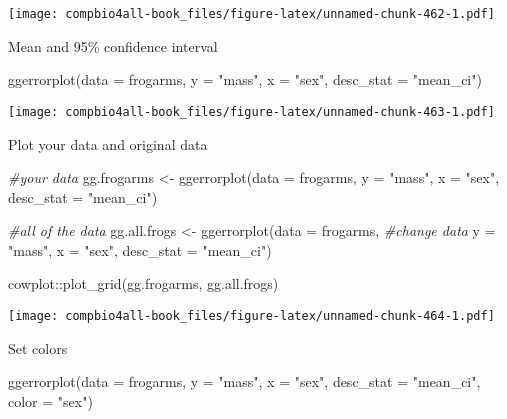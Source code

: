 \documentclass[
]{book}
\newenvironment{Shaded}{\begin{snugshade}}{\end{snugshade}}
\newcommand{\AttributeTok}[1]{\textcolor[rgb]{0.77,0.63,0.00}{#1}}
\newcommand{\CommentTok}[1]{\textcolor[rgb]{0.56,0.35,0.01}{\textit{#1}}}
\newcommand{\FunctionTok}[1]{\textcolor[rgb]{0.00,0.00,0.00}{#1}}
\newcommand{\NormalTok}[1]{#1}
\newcommand{\OtherTok}[1]{\textcolor[rgb]{0.56,0.35,0.01}{#1}}
\newcommand{\SpecialCharTok}[1]{\textcolor[rgb]{0.00,0.00,0.00}{#1}}
\newcommand{\StringTok}[1]{\textcolor[rgb]{0.31,0.60,0.02}{#1}}
\begin{document}
\texttt{[image: compbio4all-book\_files/figure-latex/unnamed-chunk-462-1.pdf]}

Mean and 95\% confidence interval

\begin{Shaded}
\begin{Highlighting}[]
\FunctionTok{ggerrorplot}\NormalTok{(}\AttributeTok{data =}\NormalTok{ frogarms,}
          \AttributeTok{y =} \StringTok{"mass"}\NormalTok{,}
          \AttributeTok{x =} \StringTok{"sex"}\NormalTok{,}
          \AttributeTok{desc\_stat =} \StringTok{"mean\_ci"}\NormalTok{)}
\end{Highlighting}
\end{Shaded}

\texttt{[image: compbio4all-book\_files/figure-latex/unnamed-chunk-463-1.pdf]}

Plot your data and original data

\begin{Shaded}
\begin{Highlighting}[]
\CommentTok{\#your data}
\NormalTok{gg.frogarms }\OtherTok{\textless{}{-}} \FunctionTok{ggerrorplot}\NormalTok{(}\AttributeTok{data =}\NormalTok{ frogarms,}
          \AttributeTok{y =} \StringTok{"mass"}\NormalTok{,}
          \AttributeTok{x =} \StringTok{"sex"}\NormalTok{,}
          \AttributeTok{desc\_stat =} \StringTok{"mean\_ci"}\NormalTok{)}

\CommentTok{\#all of the data}
\NormalTok{gg.all.frogs }\OtherTok{\textless{}{-}} \FunctionTok{ggerrorplot}\NormalTok{(}\AttributeTok{data =}\NormalTok{ frogarms, }\CommentTok{\#change data}
          \AttributeTok{y =} \StringTok{"mass"}\NormalTok{,}
          \AttributeTok{x =} \StringTok{"sex"}\NormalTok{,}
          \AttributeTok{desc\_stat =} \StringTok{"mean\_ci"}\NormalTok{)}

\NormalTok{cowplot}\SpecialCharTok{::}\FunctionTok{plot\_grid}\NormalTok{(gg.frogarms, gg.all.frogs)}
\end{Highlighting}
\end{Shaded}

\texttt{[image: compbio4all-book\_files/figure-latex/unnamed-chunk-464-1.pdf]}

Set colors

\begin{Shaded}
\begin{Highlighting}[]
\FunctionTok{ggerrorplot}\NormalTok{(}\AttributeTok{data =}\NormalTok{ frogarms,}
          \AttributeTok{y =} \StringTok{"mass"}\NormalTok{,}
          \AttributeTok{x =} \StringTok{"sex"}\NormalTok{,}
          \AttributeTok{desc\_stat =} \StringTok{"mean\_ci"}\NormalTok{,}
          \AttributeTok{color =} \StringTok{"sex"}\NormalTok{)}
\end{Highlighting}
\end{Shaded}
\end{document}
